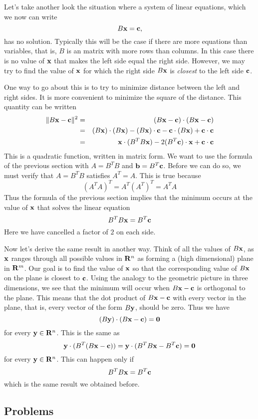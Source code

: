 Let's take another look the situation where a system of linear equations,
which we now can write
\[
B{\bf x} ={\bf c},
\]
has no solution. Typically this will be the case if there are more
equations than variables, that is, $B$ is an matrix with more rows
than columns. In this case there is no value of ${\bf x}$ that makes
the left side equal the right side. However, we may try to find
the value of ${\bf x}$ for which the right side $B{\bf x}$ is {\it closest} to the left
side ${\bf c}$. 

One way to go about this is to try to minimize distance between
the left and right sides. It is more convenient to minimize
the square of the distance. This quantity can be written
\begin{eqnarray*}
\|B{\bf x}-{\bf c}\|^2 &=& (B{\bf x}-{\bf c})\cdot(B{\bf x}-{\bf c}) \\
&=&(B{\bf x})\cdot(B{\bf x}) - (B{\bf x})\cdot{\bf c} - {\bf c}\cdot(B{\bf x}) + {\bf c}\cdot{\bf c} \\
&=&{\bf x}\cdot(B^TB{\bf x}) - 2(B^T{\bf c})\cdot{\bf x} + {\bf c}\cdot{\bf c}
\end{eqnarray*}
This is a quadratic function, written in matrix form. 
We want to  use the formula of the previous section 
with $A=B^TB$ and ${\bf b}=B^T{\bf c}$. Before we can do so, we must verify
that $A=B^TB$ satisfies $A^T=A$. This is true because
\[
(A^TA)^T = A^T(A^T)^T = A^T A
\]
Thus the formula of the previous section implies 
that the minimum
occurs at the value of ${\bf x}$ that solves the linear equation
\[
B^TB{\bf x} = B^T{\bf c}
\]
Here we have cancelled a factor of $2$ on each side.

Now let's derive the same result in another way. Think of all the values
of $B{\bf x}$, as ${\bf x}$ ranges through all possible values in ${\bf R}^n$
as forming a (high dimensional) plane in ${\bf R}^m$. Our goal is to find
the value of ${\bf x}$ so that the corresponding value of $B{\bf x}$ on the
plane is closest to ${\bf c}$. Using the analogy to the geometric picture
in three dimensions, we see that the minimum will occur when $B{\bf x}-{\bf c}$
is orthogonal to the plane. This means that the dot product of $B{\bf x}-{\bf c}$
with every vector in the plane, that is, every vector of the form $B{\bf y}$,
should be zero. Thus we have
\[
(B{\bf y})\cdot(B{\bf x} - {\bf c}) = {\bf 0}
\]
for every ${\bf y}\in {\bf R}^n$. This is the same as
\[
{\bf y}\cdot(B^T(B{\bf x} - {\bf c})) = {\bf y}\cdot(B^TB{\bf x} - B^T{\bf c}) = {\bf 0}
\]
for every ${\bf y}\in {\bf R}^n$. This can happen only if
\[
B^TB{\bf x} = B^T{\bf c}
\]
which is the same result we obtained before. 

\subsection{Problems}

